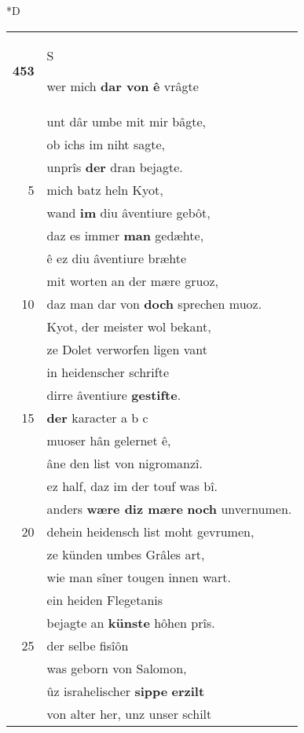 \documentclass[8pt,a4paper,notitlepage]{article}
\begin{document}
\begin{table}[ht]
\begin{minipage}[t]{0.5\linewidth}
\small
\begin{center}*D
\end{center}
\begin{tabular}{rl}
\textbf{453} & \begin{large}S\end{large}wer mich \textbf{dar von} \textbf{ê} vrâgte\\ 
 & unt dâr umbe mit mir bâgte,\\ 
 & ob ichs im niht sagte,\\ 
 & unprîs \textbf{der} dran bejagte.\\ 
5 & mich batz heln Kyot,\\ 
 & wand \textbf{im} diu âventiure gebôt,\\ 
 & daz es immer \textbf{man} gedæhte,\\ 
 & ê ez diu âventiure bræhte\\ 
 & mit worten an der mære gruoz,\\ 
10 & daz man dar von \textbf{doch} sprechen muoz.\\ 
 & Kyot, der meister wol bekant,\\ 
 & ze Dolet verworfen ligen vant\\ 
 & in heidenscher schrifte\\ 
 & dirre âventiure \textbf{gestifte}.\\ 
15 & \textbf{der} karacter a b c\\ 
 & muoser hân gelernet ê,\\ 
 & âne den list von nigromanzî.\\ 
 & ez half, daz im der touf was bî.\\ 
 & anders \textbf{wære diz mære} \textbf{noch} unvernumen.\\ 
20 & dehein heidensch list moht gevrumen,\\ 
 & ze künden umbes Grâles art,\\ 
 & wie man sîner tougen innen wart.\\ 
 & ein heiden Flegetanis\\ 
 & bejagte an \textbf{künste} hôhen prîs.\\ 
25 & der selbe fisîôn\\ 
 & was geborn von Salomon,\\ 
 & ûz israhelischer \textbf{sippe} \textbf{erzilt}\\ 
 & von alter her, unz unser schilt\\ 

\end{tabular}
\end{minipage}
\end{table}
\end{document}

